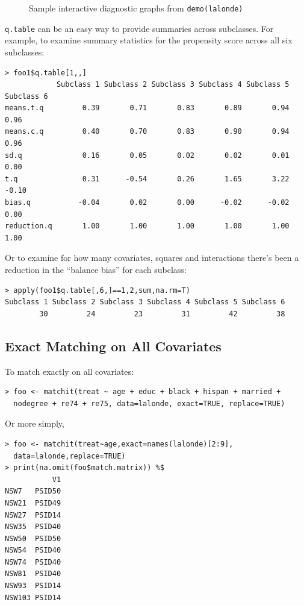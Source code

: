 \documentclass[oneside,letterpaper,titlepage]{article}
\begin{document}
\begin{figure}[tbp]
\begin{center}
    \hfill
    \caption{Sample interactive diagnostic graphs from \texttt{demo(lalonde)}}
\label{diags}
\end{center}
\end{figure}

\texttt{q.table} can be an easy way to provide summaries across
subclasses.  For example, to examine summary statistics for the
propensity score across all six subclasses:

\begin{footnotesize}
\begin{verbatim}
> foo1$q.table[1,,]
            Subclass 1 Subclass 2 Subclass 3 Subclass 4 Subclass 5 Subclass 6
means.t.q         0.39       0.71       0.83       0.89       0.94       0.96
means.c.q         0.40       0.70       0.83       0.90       0.94       0.96
sd.q              0.16       0.05       0.02       0.02       0.01       0.00
t.q               0.31      -0.54       0.26       1.65       3.22      -0.10
bias.q           -0.04       0.02       0.00      -0.02      -0.02       0.00
reduction.q       1.00       1.00       1.00       1.00       1.00       1.00
\end{verbatim}
\end{footnotesize}

Or to examine for how many covariates, squares and interactions there's been a reduction in the
``balance bias'' for each subclass: 

\begin{footnotesize}
\begin{verbatim}
> apply(foo1$q.table[,6,]==1,2,sum,na.rm=T)
Subclass 1 Subclass 2 Subclass 3 Subclass 4 Subclass 5 Subclass 6 
        30         24         23         31         42         38 
\end{verbatim}
\end{footnotesize}

\subsection{Exact Matching on All Covariates}

To match exactly on all covariates:

\begin{verbatim}
> foo <- matchit(treat ~ age + educ + black + hispan + married +
  nodegree + re74 + re75, data=lalonde, exact=TRUE, replace=TRUE)
\end{verbatim}

Or more simply,

\begin{verbatim}
> foo <- matchit(treat~age,exact=names(lalonde)[2:9],
  data=lalonde,replace=TRUE)
> print(na.omit(foo$match.matrix)) %$
           V1
NSW7   PSID50
NSW21  PSID49
NSW27  PSID14
NSW35  PSID40
NSW50  PSID50
NSW54  PSID40
NSW74  PSID40
NSW81  PSID40
NSW93  PSID14
NSW103 PSID14
\end{verbatim}
\end{document}
